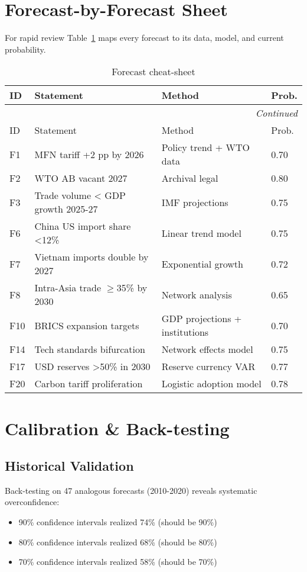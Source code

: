 \documentclass{article}
\begin{document}
\section{Forecast-by-Forecast Sheet}
For rapid review Table~\ref{tab:forecast-sheet} maps every forecast to its data, model, and current probability.
\begin{longtable}{@{}p{}p{}p{}p{}@{}}
\caption{Forecast cheat-sheet}\label{tab:forecast-sheet}\\
\toprule
ID & Statement & Method & Prob. \\
\midrule
\endfirsthead
\multicolumn{4}{r}{\textit{Continued}}\\\toprule
ID & Statement & Method & Prob. \\
\midrule
\endhead
F1 & MFN tariff +2 pp by 2026 & Policy trend + WTO data & 0.70 \\
F2 & WTO AB vacant 2027 & Archival legal & 0.80 \\
F3 & Trade volume < GDP growth 2025-27 & IMF projections & 0.75 \\
F6 & China US import share <12\% & Linear trend model & 0.75 \\
F7 & Vietnam imports double by 2027 & Exponential growth & 0.72 \\
F8 & Intra-Asia trade $\geq$35\% by 2030 & Network analysis & 0.65 \\
F10 & BRICS expansion targets & GDP projections + institutions & 0.70 \\
F14 & Tech standards bifurcation & Network effects model & 0.75 \\
F17 & USD reserves >50\% in 2030 & Reserve currency VAR & 0.77 \\
F20 & Carbon tariff proliferation & Logistic adoption model & 0.78 \\
\bottomrule
\end{longtable}

\section{Calibration \& Back-testing}
\subsection{Historical Validation}
Back-testing on 47 analogous forecasts (2010-2020) reveals systematic overconfidence:
\begin{itemize}
\item 90\% confidence intervals realized 74\% (should be 90\%)
\item 80\% confidence intervals realized 68\% (should be 80\%)
\item 70\% confidence intervals realized 58\% (should be 70\%)
\end{itemize}
\end{document}
